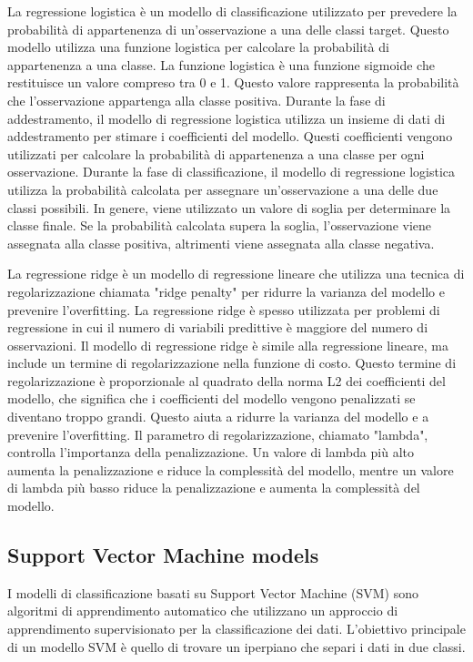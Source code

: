 \documentclass[italian,12pt,a4paper]{article}
\begin{document}
     La regressione logistica è un modello di classificazione utilizzato per prevedere la probabilità di appartenenza di un'osservazione a una delle classi target. Questo modello utilizza una funzione logistica per calcolare la probabilità di appartenenza a una classe. La funzione logistica è una funzione sigmoide che restituisce un valore compreso tra 0 e 1. Questo valore rappresenta la probabilità che l'osservazione appartenga alla classe positiva. Durante la fase di addestramento, il modello di regressione logistica utilizza un insieme di dati di addestramento per stimare i coefficienti del modello. Questi coefficienti vengono utilizzati per calcolare la probabilità di appartenenza a una classe per ogni osservazione. Durante la fase di classificazione, il modello di regressione logistica utilizza la probabilità calcolata per assegnare un'osservazione a una delle due classi possibili. In genere, viene utilizzato un valore di soglia per determinare la classe finale. Se la probabilità calcolata supera la soglia, l'osservazione viene assegnata alla classe positiva, altrimenti viene assegnata alla classe negativa.
     \\
     \vspace{25pt}


     La regressione ridge è un modello di regressione lineare che utilizza una tecnica di regolarizzazione chiamata "ridge penalty" per ridurre la varianza del modello e prevenire l'overfitting. La regressione ridge è spesso utilizzata per problemi di regressione in cui il numero di variabili predittive è maggiore del numero di osservazioni. Il modello di regressione ridge è simile alla regressione lineare, ma include un termine di regolarizzazione nella funzione di costo. Questo termine di regolarizzazione è proporzionale al quadrato della norma L2 dei coefficienti del modello, che significa che i coefficienti del modello vengono penalizzati se diventano troppo grandi. Questo aiuta a ridurre la varianza del modello e a prevenire l'overfitting. Il parametro di regolarizzazione, chiamato "lambda", controlla l'importanza della penalizzazione. Un valore di lambda più alto aumenta la penalizzazione e riduce la complessità del modello, mentre un valore di lambda più basso riduce la penalizzazione e aumenta la complessità del modello.

    \subsection{Support Vector Machine models}
    I modelli di classificazione basati su Support Vector Machine (SVM) sono algoritmi di apprendimento automatico che utilizzano un approccio di apprendimento supervisionato per la classificazione dei dati. L'obiettivo principale di un modello SVM è quello di trovare un iperpiano che separi i dati in due classi.
    \\
    \vspace{25pt}
\end{document}

